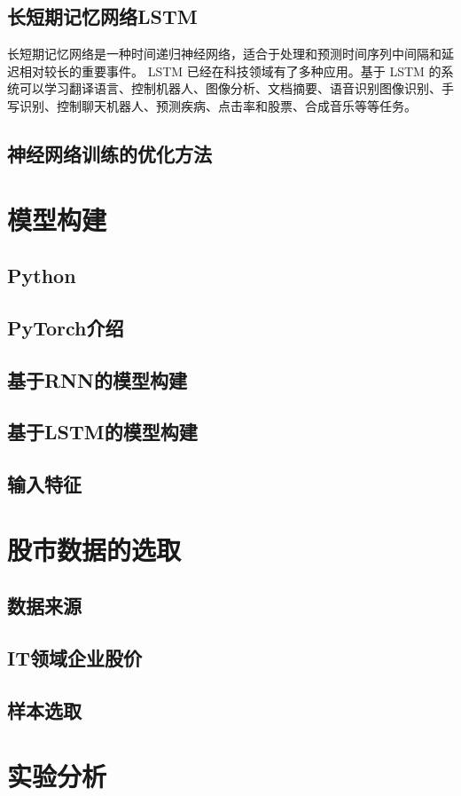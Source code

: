 \documentclass[UTF8]{ctexart}
\begin{document}
\subsection{长短期记忆网络LSTM}
长短期记忆网络是一种时间递归神经网络，适合于处理和预测时间序列中间隔和延迟相对较长的重要事件。
LSTM 已经在科技领域有了多种应用。基于 LSTM 的系统可以学习翻译语言、控制机器人、图像分析、文档摘要、语音识别图像识别、手写识别、控制聊天机器人、预测疾病、点击率和股票、合成音乐等等任务。
\subsection{神经网络训练的优化方法}
\section{模型构建}
\subsection{Python}
\subsection{PyTorch介绍}
\subsection{基于RNN的模型构建}
\subsection{基于LSTM的模型构建}
\subsection{输入特征}
\section{股市数据的选取}
\subsection{数据来源}
\subsection{IT领域企业股价}
\subsection{样本选取}
\section{实验分析}
\end{document}

